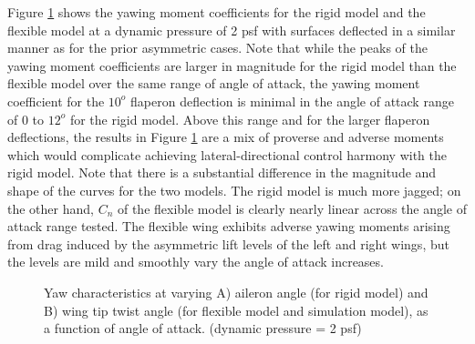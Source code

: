 \documentclass[11pt]{ucthesis}
\begin{document}
Figure \ref{fig:Q2Yaw} shows the yawing moment coefficients for the rigid model and the flexible model at a dynamic pressure of 2 psf with surfaces deflected in a similar manner as for the prior asymmetric cases. Note that while the peaks of the yawing moment coefficients are larger in magnitude for the rigid model than the flexible model over the same range of angle of attack, the yawing moment coefficient for the $10^o$ flaperon deflection is minimal in the angle of attack range of 0 to $12^o$ for the rigid model. Above this range and for the larger flaperon deflections, the results in Figure \ref{fig:Q2Yaw} are a mix of proverse and adverse moments which would complicate achieving lateral-directional control harmony with the rigid model. Note that there is a substantial difference in the magnitude and shape of the curves for the two models. The rigid model is much more jagged; on the other hand, $C_n$ of the flexible model is clearly nearly linear across the angle of attack range tested. The flexible wing exhibits adverse yawing moments arising from drag induced by the asymmetric lift levels of the left and right wings, but the levels are mild and smoothly vary the angle of attack increases.

\begin{figure}[thpb]
\hfill
{}
\hfill
{}
\hfill
\caption{Yaw characteristics at varying A) aileron angle (for rigid model) and B) wing tip twist angle (for flexible model and simulation model), as a function of angle of attack. (dynamic pressure = 2 psf)}
\label{fig:Q2Yaw}
\end{figure}
\end{document}
